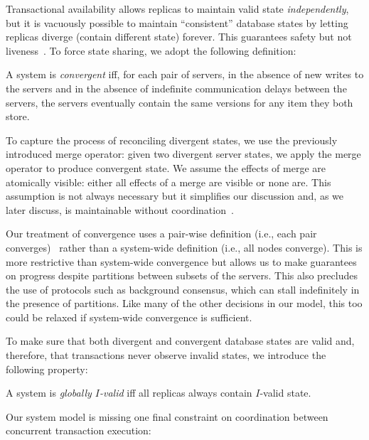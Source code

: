 Transactional availability allows replicas to
maintain valid state \textit{independently}, but it is vacuously
possible to maintain ``consistent'' database states by letting
replicas diverge (contain different state) forever. This guarantees
safety but not liveness~\cite{schneider-concurrent}. To force state
sharing, we adopt the following definition:

\begin{definition}
  A system is \textit{convergent} iff, for each pair of servers, in
  the absence of new writes to the servers and in the
  absence of indefinite communication delays between the servers,
  the servers eventually contain the same versions for any item
  they both store.
\end{definition}

To capture the process of reconciling divergent states, we use the
previously introduced merge operator: given two divergent server
states, we apply the merge operator to produce convergent state. We
assume the effects of merge are atomically visible: either all effects
of a merge are visible or none are. This assumption is not always
necessary but it simplifies our discussion and, as we later discuss,
is maintainable without coordination~\cite{ramp-sigmod14,hat-vldb}.

Our treatment of convergence uses a pair-wise definition (i.e., each
pair converges)~\cite{cac} rather than a system-wide definition (i.e., all nodes
converge). This is more restrictive than system-wide convergence but
allows us to make guarantees on progress despite partitions
between subsets of the servers. This also precludes the use of protocols such
as background consensus, which can stall indefinitely in the presence
of partitions. Like many of the other decisions in our model, this
too could be relaxed if system-wide convergence is sufficient.

 To make sure that both divergent and
convergent database states are valid and, therefore, that transactions
never observe invalid states, we introduce the following property:

\begin{definition}
A system is \textit{globally $I$-valid} iff all replicas always contain
$I$-valid state.
\end{definition}

 Our system model is missing one final
constraint on coordination between concurrent transaction
execution:

